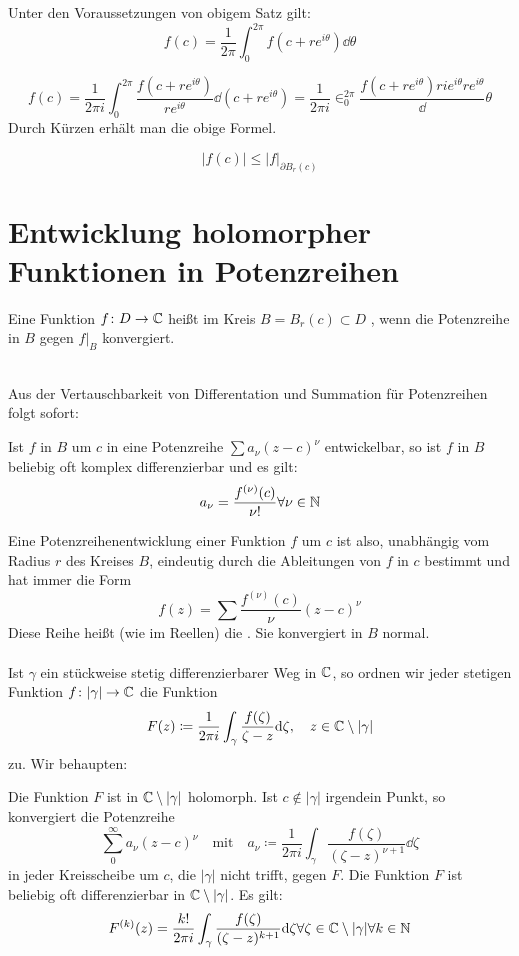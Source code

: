\begin{korollar}[Mittelwertgleichung]
	Unter den Voraussetzungen von obigem Satz gilt:
	\[ f(c)=\frac{1}{2\pi}\int_0^{2\pi}f(c+re^{i\theta})\dd\theta \]
\end{korollar}
\begin{beweis}
	\[ f(c)=\frac{1}{2\pi i}\int_0^{2\pi}\frac{f(c+re^{i\theta})}{re^{i\theta}}\dd(c+re^{i\theta})=\frac{1}{2\pi i}\in_0^{2\pi}\frac{f(c+re^{i\theta})rie^{i\theta}{re^{i\theta}}}\dd\theta \]
	Durch K\"urzen erh\"alt man die obige Formel.
\end{beweis}
\begin{korollar}[Mittelwertungleichung]
	\[ |f(c)|\leq |f|_{\partial B_r(c)} \]
\end{korollar}
\section{Entwicklung holomorpher Funktionen in Potenzreihen}
\begin{definition}
	Eine Funktion $ f\colon D\rightarrow\mathbb{C} $ hei\ss t im Kreis $ B=B_r(c)\subset D $ , wenn die Potenzreihe in $ B $ gegen $ f|_B $ konvergiert.
\end{definition}
\\
Aus der Vertauschbarkeit von Differentation und Summation f\"ur Potenzreihen folgt sofort:
\begin{satz}
	Ist $ f $ in $ B $ um $ c $ in eine Potenzreihe $ \sum a_\nu(z-c)^\nu $ entwickelbar, so ist $ f $ in $ B $ beliebig oft komplex differenzierbar und es gilt:
	\[ a_\nu=\frac{f^{(\nu)}(c)}{\nu!}\forall \nu\in\mathbb{N} \]
\end{satz}
Eine Potenzreihenentwicklung einer Funktion $ f $ um $ c $ ist also, unabh\"angig vom Radius $ r $ des Kreises $ B $, eindeutig durch die Ableitungen von $ f $ in $ c $ bestimmt und hat immer die Form
\[ f(z)=\sum\frac{f^{(\nu)}(c)}{\nu}(z-c)^\nu \]
Diese Reihe hei\ss t (wie im Reellen) die . Sie konvergiert in $ B $ normal.\\
\\
Ist $ \gamma $ ein st\"uckweise stetig differenzierbarer Weg in $ \mathbb{C} $, so ordnen wir jeder stetigen Funktion $ f\colon |\gamma|\rightarrow\mathbb{C} $ die Funktion \[ F(z)\coloneqq\frac{1}{2\pi i}\int_\gamma\frac{f(\zeta)}{\zeta-z}\mathrm d\zeta,\quad z\in\mathbb{C}\setminus|\gamma| \]
zu. Wir behaupten:
\begin{lemma}[Entwicklungslemma]
	Die Funktion $ F $ ist in $ \mathbb{C}\setminus|\gamma| $ holomorph. Ist $ c\notin|\gamma| $ irgendein Punkt, so konvergiert die Potenzreihe
	\[ \sum_{0}^{\infty}a_\nu(z-c)^\nu\quad\text{mit}\quad a_\nu\coloneqq\frac{1}{2\pi i}\int_{\gamma}^{}\frac{f(\zeta)}{(\zeta-z)^{\nu+1}}\dd\zeta \]
	in jeder Kreisscheibe um $ c $, die $ |\gamma| $ nicht trifft, gegen $ F $. Die Funktion $ F $ ist beliebig oft differenzierbar in $ \mathbb{C}\setminus|\gamma| $. Es gilt:
	\[ F^{(k)}(z)=\frac{k!}{2\pi i}\int_\gamma\frac{f(\zeta)}{(\zeta-z)^{k+1}}\mathrm d\zeta\forall\zeta\in\mathbb{C}\setminus|\gamma|\forall k\in\mathbb{N} \]
\end{lemma} 
